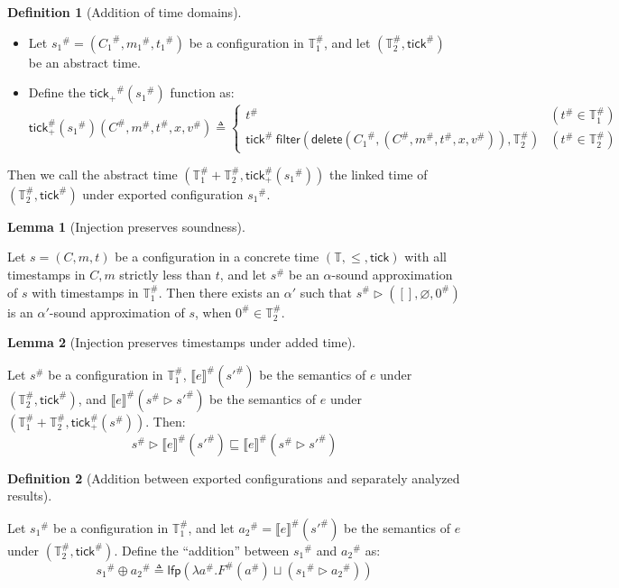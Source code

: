 \documentclass[acmsmall,screen,review]{acmart}
\theoremstyle{definition}
\newtheorem{definition}{Definition}[section]
\newtheorem{lem}{Lemma}[section]
\newcommand*{\A}[1]{{#1}^{\#}}
\newcommand*{\Time}{\mathbb{T}}
\newcommand*{\ATime}{\A{\Time}}
\newcommand*{\mem}{m}
\newcommand*{\sembracket}[1]{\lBrack{#1}\rBrack}
\newcommand*{\tick}{\mathsf{tick}}
\newcommand*{\delete}{\mathsf{delete}}
\newcommand*{\filter}{\mathsf{filter}}
\begin{document}
\begin{definition}[Addition of time domains]
  $\:$

  \begin{itemize}
    \item Let $\A{s_1}=(\A{C_1},\A{\mem_1},\A{t_1})$ be a configuration in $\ATime_1$, and let $(\ATime_2,\A{\tick})$ be an abstract time.
    \item Define the $\A{\tick_{+}}(\A{s_1})$ function as:
          \[
            \A\tick_{+}(\A{s_1})(\A{C},\A\mem,\A{t},x,\A{v})\triangleq
            \begin{cases}
              \A{t}                                                                      & (\A{t}\in\ATime_1) \\
              \A{\tick}\:\filter(\delete(\A{C_1},(\A{C},\A\mem,\A{t},x,\A{v})),\ATime_2) & (\A{t}\in\ATime_2)
            \end{cases}
          \]
  \end{itemize}

  Then we call the abstract time $(\ATime_1+\ATime_2,\A\tick_{+}(\A{s_1}))$ the linked time of $(\ATime_2,\A{\tick})$ under exported configuration $\A{s_1}$.
\end{definition}

\begin{lem}[Injection preserves soundness]
  $\:$

  Let $s=(C,\mem,t)$ be a configuration in a concrete time $(\Time,\le,\tick)$ with all timestamps in $C,\mem$ strictly less than $t$, and let $\A{s}$ be an $\alpha$-sound approximation of $s$ with timestamps in $\ATime_1$.
  Then there exists an $\alpha'$ such that $\A{s}\rhd([],\varnothing,\A{0})$ is an $\alpha'$-sound approximation of $s$, when $\A{0}\in\ATime_2$.
\end{lem}

\begin{lem}[Injection preserves timestamps under added time]
  $\:$

  Let $\A{s}$ be a configuration in $\ATime_1$, $\A{\sembracket{e}}(\A{s'})$ be the semantics of $e$ under $(\ATime_2,\A\tick)$, and $\A{\sembracket{e}}(\A{s}\rhd\A{s'})$ be the semantics of $e$ under $(\ATime_1+\ATime_2,\A\tick_{+}(\A{s}))$.
  Then:
  \[
    \A{s}\rhd\A{\sembracket{e}}(\A{s'})\sqsubseteq\A{\sembracket{e}}(\A{s}\rhd\A{s'})
  \]
\end{lem}

\begin{definition}[Addition between exported configurations and separately analyzed results]
  $\:$

  Let $\A{s_1}$ be a configuration in $\ATime_1$, and let $\A{a_2}=\A{\sembracket{e}}(\A{s'})$ be the semantics of $e$ under $(\ATime_2,\A\tick)$.
  Define the ``addition'' between $\A{s_1}$ and $\A{a_2}$ as:
  \[
    \A{s_1}\oplus\A{a_2}\triangleq\mathsf{lfp}(\lambda\A{a}.\A{F}(\A{a})\sqcup(\A{s_1}\rhd\A{a_2}))
  \]
\end{definition}
\end{document}
